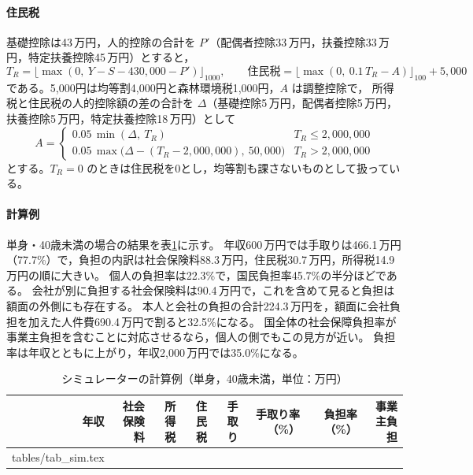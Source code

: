 \documentclass[paper=a4,fontsize=10pt]{jlreq}
\makeatletter
\newcommand{\tabinput}[1]{\@@input #1 }
\newcommand{\man}{\,万円}
\makeatother
\begin{document}
\paragraph{住民税}
基礎控除は43\man，人的控除の合計を $P'$（配偶者控除33\man，扶養控除33\man，特定扶養控除45\man）とすると，
\begin{equation}
  T_R = \bigl\lfloor \max(0,\ Y - S - 430{,}000 - P') \bigr\rfloor_{1000},\qquad
  \text{住民税} = \bigl\lfloor \max(0,\ 0.1\,T_R - A) \bigr\rfloor_{100} + 5{,}000
\end{equation}
である。5,000円は均等割4,000円と森林環境税1,000円\cite{soumu}，$A$ は調整控除で，
所得税と住民税の人的控除額の差の合計を $\Delta$（基礎控除5\man，配偶者控除5\man，扶養控除5\man，特定扶養控除18\man）として
\begin{equation}
  A=
  \begin{cases}
    0.05\,\min(\Delta,\ T_R) & T_R \le 2{,}000{,}000\\
    0.05\,\max\bigl(\Delta-(T_R-2{,}000{,}000),\ 50{,}000\bigr) & T_R > 2{,}000{,}000
  \end{cases}
\end{equation}
とする\cite{osaka}。$T_R=0$ のときは住民税を0とし，均等割も課さないものとして扱っている。

\paragraph{計算例}
単身・40歳未満の場合の結果を表\ref{tab:sim}に示す。
年収600\man では手取りは466.1\man（77.7\%）で，負担の内訳は社会保険料88.3\man，住民税30.7\man，所得税14.9\man の順に大きい。
個人の負担率は22.3\%で，国民負担率45.7\%の半分ほどである。
会社が別に負担する社会保険料は90.4\man で，これを含めて見ると負担は額面の外側にも存在する。
本人と会社の負担の合計224.3\man を，額面に会社負担を加えた人件費690.4\man で割ると32.5\%になる。
国全体の社会保障負担率が事業主負担を含むことに対応させるなら，個人の側でもこの見方が近い。
負担率は年収とともに上がり，年収2,000\man では35.0\%になる。

\begin{table}[htbp]
  \centering
  \caption{シミュレーターの計算例（単身，40歳未満，単位：万円）}\label{tab:sim}
  \begin{tabular}{rrrrrrrr}
    \toprule
    年収 & 社会保険料 & 所得税 & 住民税 & 手取り & 手取り率（\%） & 負担率（\%） & 事業主負担 \\
    \midrule
    \tabinput{tables/tab_sim.tex}
    \bottomrule
  \end{tabular}
\end{table}
\end{document}
